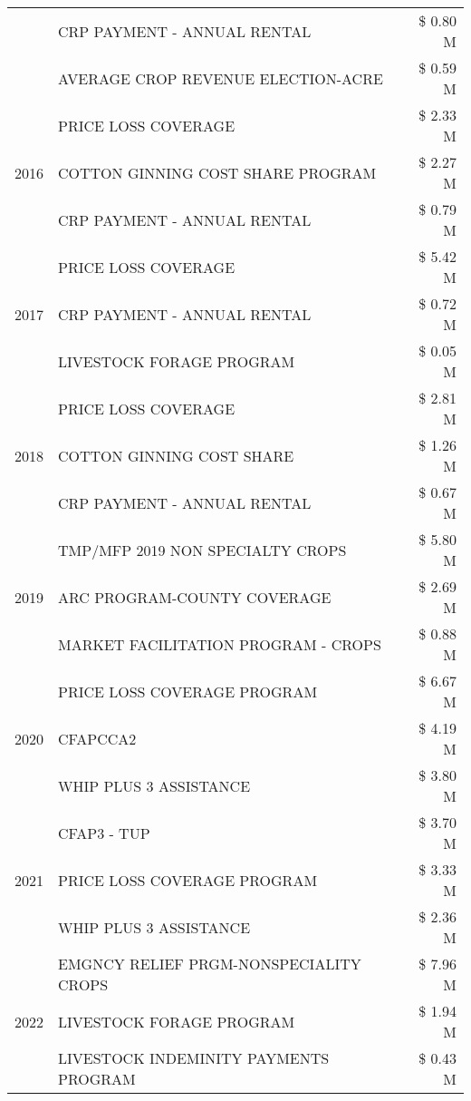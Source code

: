 \begin{tabular}{llr}
 & CRP PAYMENT - ANNUAL RENTAL & \$ 0.80 M \\
 & AVERAGE CROP REVENUE ELECTION-ACRE & \$ 0.59 M \\
\cline{1-3}
\multirow[t]{3}{*}{2016} & PRICE LOSS COVERAGE & \$ 2.33 M \\
 & COTTON GINNING COST SHARE PROGRAM & \$ 2.27 M \\
 & CRP PAYMENT - ANNUAL RENTAL & \$ 0.79 M \\
\cline{1-3}
\multirow[t]{3}{*}{2017} & PRICE LOSS COVERAGE & \$ 5.42 M \\
 & CRP PAYMENT - ANNUAL RENTAL & \$ 0.72 M \\
 & LIVESTOCK FORAGE PROGRAM & \$ 0.05 M \\
\cline{1-3}
\multirow[t]{3}{*}{2018} & PRICE LOSS COVERAGE & \$ 2.81 M \\
 & COTTON GINNING COST SHARE & \$ 1.26 M \\
 & CRP PAYMENT - ANNUAL RENTAL & \$ 0.67 M \\
\cline{1-3}
\multirow[t]{3}{*}{2019} & TMP/MFP 2019 NON SPECIALTY CROPS & \$ 5.80 M \\
 & ARC PROGRAM-COUNTY COVERAGE & \$ 2.69 M \\
 & MARKET FACILITATION PROGRAM - CROPS & \$ 0.88 M \\
\cline{1-3}
\multirow[t]{3}{*}{2020} & PRICE LOSS COVERAGE PROGRAM & \$ 6.67 M \\
 & CFAPCCA2 & \$ 4.19 M \\
 & WHIP PLUS 3 ASSISTANCE & \$ 3.80 M \\
\cline{1-3}
\multirow[t]{3}{*}{2021} & CFAP3 - TUP & \$ 3.70 M \\
 & PRICE LOSS COVERAGE PROGRAM & \$ 3.33 M \\
 & WHIP PLUS 3 ASSISTANCE & \$ 2.36 M \\
\cline{1-3}
\multirow[t]{3}{*}{2022} & EMGNCY RELIEF PRGM-NONSPECIALITY CROPS & \$ 7.96 M \\
 & LIVESTOCK FORAGE PROGRAM & \$ 1.94 M \\
 & LIVESTOCK INDEMINITY PAYMENTS PROGRAM & \$ 0.43 M \\
\cline{1-3}
\bottomrule
\end{tabular}
